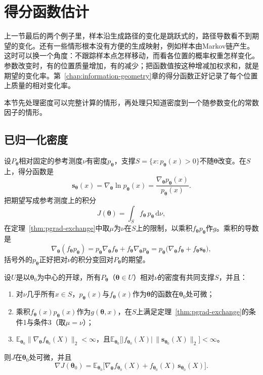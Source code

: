 \section{得分函数估计}
\label{sec:pgrad-score}

上一节最后的两个例子里，样本沿生成路径的变化是跳跃式的，路径导数看不到期望的变化。还有一些情形根本没有方便的生成映射，例如样本由Markov链产生。这时可以换一个角度：不跟踪样本点怎样移动，而看各位置的概率权重怎样变化。参数改变时，有的位置质量增加，有的减少；把函数值按这种增减加权求和，就是期望的变化率。第~\ref{chap:information-geometry}章的得分函数正好记录了每个位置上质量的相对变化率。

本节先处理密度可以完整计算的情形，再处理只知道密度到一个随参数变化的常数因子的情形。

\subsection{已归一化密度}
\label{sec:pgrad-score-normalized}

设$P_{\bm{\theta}}$相对固定的参考测度$\nu$有密度$p_{\bm{\theta}}$，支撑$S=\{x:p_{\bm{\theta}}(x)>0\}$不随$\bm{\theta}$改变。在$S$上，得分函数是
\[
  \bm{s}_{\bm{\theta}}(x)=\nabla_{\bm{\theta}}\ln p_{\bm{\theta}}(x)=\frac{\nabla_{\bm{\theta}}p_{\bm{\theta}}(x)}{p_{\bm{\theta}}(x)} .
\]
把期望写成参考测度上的积分
\[
  J(\bm{\theta})=\int_{S}f_{\bm{\theta}}\,p_{\bm{\theta}}\,\mathrm{d}\nu,
\]
在定理~\ref{thm:pgrad-exchange}中取$\mu$为$\nu$在$S$上的限制，以乘积$f_{\bm{\theta}}p_{\bm{\theta}}$作$g$。乘积的导数是
\[
  \nabla_{\bm{\theta}}(f_{\bm{\theta}}p_{\bm{\theta}})=p_{\bm{\theta}}\nabla_{\bm{\theta}}f_{\bm{\theta}}+f_{\bm{\theta}}\nabla_{\bm{\theta}}p_{\bm{\theta}}=p_{\bm{\theta}}\bigl(\nabla_{\bm{\theta}}f_{\bm{\theta}}+f_{\bm{\theta}}\bm{s}_{\bm{\theta}}\bigr),
\]
括号外的$p_{\bm{\theta}}$正好把对$\nu$的积分变回对$P_{\bm{\theta}}$的期望。

\begin{theorem}[得分函数梯度]
\label{thm:pgrad-score}
设$U$是以$\bm{\theta}_{0}$为中心的开球，所有$P_{\bm{\theta}}$（$\bm{\theta}\in U$）相对$\nu$的密度有共同支撑$S$，并且：
\begin{enumerate}
  \item 对$\nu$几乎所有$x\in S$，$p_{\bm{\theta}}(x)$与$f_{\bm{\theta}}(x)$作为$\bm{\theta}$的函数在$\bm{\theta}_{0}$处可微；
  \item 乘积$f_{\bm{\theta}}(x)p_{\bm{\theta}}(x)$作为$g(\bm{\theta},x)$，在$S$上满足定理~\ref{thm:pgrad-exchange}的条件1与条件3（取$\mu=\nu$）；
  \item $\mathbb{E}_{\bm{\theta}_{0}}\lVert\nabla_{\bm{\theta}}f_{\bm{\theta}_{0}}(X)\rVert_{2}<\infty$，且$\mathbb{E}_{\bm{\theta}_{0}}\bigl[\lvert f_{\bm{\theta}_{0}}(X)\rvert\,\lVert\bm{s}_{\bm{\theta}_{0}}(X)\rVert_{2}\bigr]<\infty$。
\end{enumerate}
则$J$在$\bm{\theta}_{0}$处可微，并且
\begin{equation}
  \nabla J(\bm{\theta}_{0})=\mathbb{E}_{\bm{\theta}_{0}}\bigl[\nabla_{\bm{\theta}}f_{\bm{\theta}_{0}}(X)+f_{\bm{\theta}_{0}}(X)\,\bm{s}_{\bm{\theta}_{0}}(X)\bigr].
  \label{eq:pgrad-score}
\end{equation}
\end{theorem}

